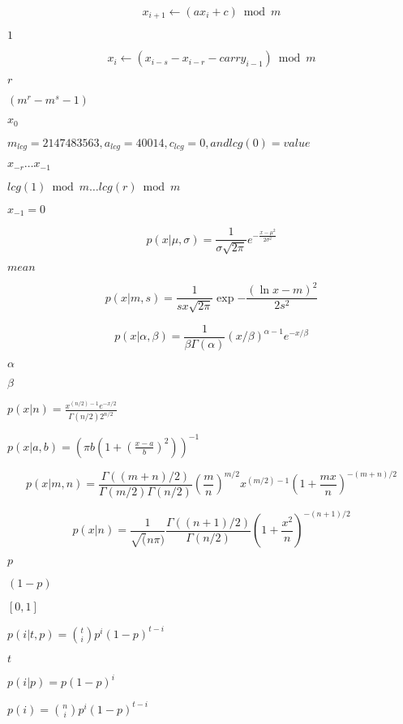 \documentclass{article}
\begin{document}
\[
    x_{i+1}\leftarrow(ax_{i} + c) \bmod m 
\]
\pagebreak

$1$
\pagebreak

\[
    x_{i}\leftarrow(x_{i - s} - x_{i - r} - carry_{i-1}) \bmod m 
\]
\pagebreak

$r$
\pagebreak

$(m^r - m^s - 1)$
\pagebreak

$x_0$
\pagebreak

$ m_{lcg} =
2147483563, a_{lcg} = 40014, c_{lcg} = 0, and lcg(0) = value
$
\pagebreak

$ x_{-r} \dots x_{-1} $
\pagebreak

$ lcg(1) \bmod m
\dots lcg(r) \bmod m $
\pagebreak

$ x_{-1} = 0 $
\pagebreak

\[
    p(x|\mu,\sigma) = \frac{1}{\sigma \sqrt{2 \pi}}
           e^{- \frac{{x - \mu}^ {2}}{2 \sigma ^ {2}} } 
\]
\pagebreak

$mean$
\pagebreak

\[
    p(x|m,s) = \frac{1}{sx\sqrt{2\pi}}
               \exp{-\frac{(\ln{x} - m)^2}{2s^2}} 
\]
\pagebreak

\[
    p(x|\alpha,\beta) = \frac{1}{\beta\Gamma(\alpha)}
                        (x/\beta)^{\alpha - 1} e^{-x/\beta} 
\]
\pagebreak

$\alpha$
\pagebreak

$\beta$
\pagebreak

$p(x|n) = \frac{x^{(n/2) - 1}e^{-x/2}}{\Gamma(n/2) 2^{n/2}}$
\pagebreak

$p(x|a,b) = (\pi b (1 + (\frac{x-a}{b})^2))^{-1}$
\pagebreak

\[
    p(x|m,n) = \frac{\Gamma((m+n)/2)}{\Gamma(m/2)\Gamma(n/2)}
               (\frac{m}{n})^{m/2} x^{(m/2)-1}
               (1 + \frac{mx}{n})^{-(m+n)/2} 
\]
\pagebreak

\[
    p(x|n) = \frac{1}{\sqrt(n\pi)} \frac{\Gamma((n+1)/2)}{\Gamma(n/2)}
             (1 + \frac{x^2}{n}) ^{-(n+1)/2} 
\]
\pagebreak

$p$
\pagebreak

$(1 - p)$
\pagebreak

$[0, 1]$
\pagebreak

$p(i|t,p) = \binom{t}{i} p^i (1 - p)^{t - i}$
\pagebreak

$t$
\pagebreak

$p(i|p) = p(1 - p)^{i}$
\pagebreak

$p(i) = \binom{n}{i} p^i (1 - p)^{t - i}$
\pagebreak
\end{document}
